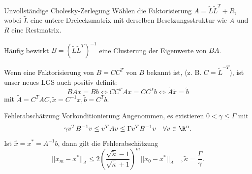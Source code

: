 \begin{karte}{Unvollständige Cholesky-Zerlegung}
    Wählen die Faktorisierung \( A = \tilde{L} \tilde{L}^T + R \), 
    wobei \(\tilde{L}\) eine untere Dreiecksmatrix mit derselben Besetzungsstruktur 
    wie \(A\) und \(R\) eine Restmatrix.

    Häufig bewirkt \( B = (\tilde{L} \tilde{L}^T)^{-1} \) eine Clusterung 
    der Eigenwerte von \(BA\).

    Wenn eine Faktorisierung von \(B = C C^T\) von \(B\) bekannt ist, 
    (z. B. \(C = \tilde{L}^{-T}\)), ist unser neues LGS auch positiv definit: 
    \[ B Ax = Bb \Leftrightarrow C C^T A x = C C^T b \Leftrightarrow \tilde{A} \tilde{x} = \tilde{b} \]
    mit \( \tilde{A} = C^T A C, \tilde{x} = C^{-1} x, \tilde{b} = C^T b \).
\end{karte}

\begin{karte}{Fehlerabschätzung Vorkonditionierung}
    Angenommen, es existieren \( 0 < \gamma \leq \Gamma \) mit 
    \[ \gamma v^T B^{-1} v \leq v^T A v \leq \Gamma v^T B^{-1} v \quad \forall v\in\R^n. \]
    Ist \( \widehat{x} = x^* = A^{-1}b \), dann gilt die Fehlerabschätzung 
    \[ ||x_m - x^*||_A \leq 2 \left( \frac{\sqrt{\tilde{\kappa}} - 1}{\sqrt{\tilde{\kappa}} + 1} \right)^m 
    ||x_0 - x^*||_A \quad, \tilde{\kappa} = \frac{\Gamma}{\gamma}. \]
\end{karte}